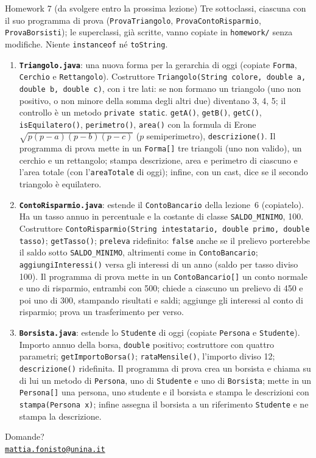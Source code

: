 \documentclass[10pt,aspectratio=169]{beamer}
\begin{document}
\begin{frame}{Homework 7 (da svolgere entro la prossima lezione)}
\footnotesize\setlength{\parskip}{0pt}
Tre sottoclassi, ciascuna con il suo programma di prova (\texttt{ProvaTriangolo}, \texttt{ProvaContoRisparmio}, \texttt{ProvaBorsisti}); le superclassi, già scritte, vanno copiate in \texttt{homework/} senza modifiche. Niente \texttt{instanceof} né \texttt{toString}.
\begin{enumerate}\itemsep=1pt
    \item \textbf{\texttt{Triangolo.java}}: una nuova forma per la gerarchia di oggi (copiate \texttt{Forma}, \texttt{Cerchio} e \texttt{Rettangolo}). Costruttore \texttt{Triangolo(String colore, double a, double b, double c)}, con i tre lati: se non formano un triangolo (uno non positivo, o non minore della somma degli altri due) diventano 3, 4, 5; il controllo è un metodo \texttt{private static}. \texttt{getA()}, \texttt{getB()}, \texttt{getC()}, \texttt{isEquilatero()}, \texttt{perimetro()}, \texttt{area()} con la formula di Erone $\sqrt{p(p-a)(p-b)(p-c)}$ ($p$ semiperimetro), \texttt{descrizione()}. Il programma di prova mette in un \texttt{Forma[]} tre triangoli (uno non valido), un cerchio e un rettangolo; stampa descrizione, area e perimetro di ciascuno e l'area totale (con l'\texttt{areaTotale} di oggi); infine, con un cast, dice se il secondo triangolo è equilatero.
    \item \textbf{\texttt{ContoRisparmio.java}}: estende il \texttt{ContoBancario} della lezione~6 (copiatelo). Ha un tasso annuo in percentuale e la costante di classe \texttt{SALDO\_MINIMO}, 100. Costruttore \texttt{ContoRisparmio(String intestatario, double primo, double tasso)}; \texttt{getTasso()}; \texttt{preleva} ridefinito: \texttt{false} anche se il prelievo porterebbe il saldo sotto \texttt{SALDO\_MINIMO}, altrimenti come in \texttt{ContoBancario}; \texttt{aggiungiInteressi()} versa gli interessi di un anno (saldo per tasso diviso 100). Il programma di prova mette in un \texttt{ContoBancario[]} un conto normale e uno di risparmio, entrambi con 500; chiede a ciascuno un prelievo di 450 e poi uno di 300, stampando risultati e saldi; aggiunge gli interessi al conto di risparmio; prova un trasferimento per verso.
    \item \textbf{\texttt{Borsista.java}}: estende lo \texttt{Studente} di oggi (copiate \texttt{Persona} e \texttt{Studente}). Importo annuo della borsa, \texttt{double} positivo; costruttore con quattro parametri; \texttt{getImportoBorsa()}; \texttt{rataMensile()}, l'importo diviso 12; \texttt{descrizione()} ridefinita. Il programma di prova crea un borsista e chiama su di lui un metodo di \texttt{Persona}, uno di \texttt{Studente} e uno di \texttt{Borsista}; mette in un \texttt{Persona[]} una persona, uno studente e il borsista e stampa le descrizioni con \texttt{stampa(Persona x)}; infine assegna il borsista a un riferimento \texttt{Studente} e ne stampa la descrizione.
\end{enumerate}
\end{frame}

\begin{frame}
\begin{center}
{\Huge Domande?}\\[2em]
{\normalsize \href{mailto:mattia.fonisto@unina.it}{\texttt{mattia.fonisto@unina.it}}}
\end{center}
\end{frame}
\end{document}
